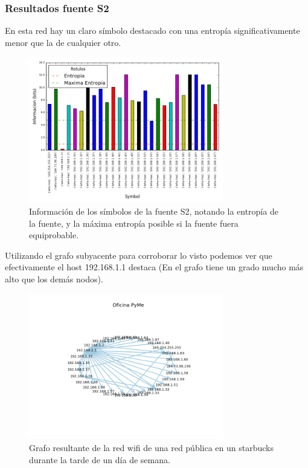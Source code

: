 \subsubsection*{Resultados fuente S2}

En esta red hay un claro símbolo destacado con una entropía significativamente menor que la de cualquier otro.

\begin{figure}[H]
 \centering
 \includegraphics[width=8.5cm]{figs/information_oficina_mediana_wifi_S2_output.png}
 \caption{\normalfont Información de los símbolos de la fuente S2, notando la entropía de la fuente, y la máxima entropía posible si la fuente fuera equiprobable.}
\end{figure}

Utilizando el grafo subyacente para corroborar lo visto podemos ver que efectivamente el host 192.168.1.1 destaca (En el grafo tiene un grado mucho más alto que los demás nodos).

\begin{figure}[H]
\centering
 \includegraphics[width=8.5cm]{figs/grafo_pyme.png}
 \caption{Grafo resultante de la red wifi de una red pública en un starbucks durante la tarde de un día de semana.}
 \label{fig:domicilio-grafo}
\end{figure}

